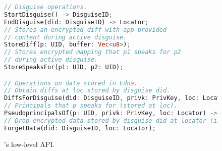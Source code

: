 \begin{figure}[t]
\begin{lstlisting}[language=Rust, style=rust]
// Disguise operations.
StartDisguise() -> DisguiseID;
EndDisguise(did: DisguiseID) -> Locator;
// Stores an encrypted diff with app-provided
// content during active disguise.
StoreDiff(p: UID, buffer: Vec<u8>);
// Stores encrypted mapping that p1 speaks for p2
// during active disguise.
StoreSpeaksFor(p1: UID, p2: UID);

// Operations on data stored in Edna.
// Obtain diffs at loc stored by disguise did.
DiffsForDisguise(did: DisguiseID, privk: PrivKey, loc: Locator) -> Vec<Vec<u8>>;
// Principals that p speaks for (stored at loc).
PseudoprincipalsOf(p: UID, privk: PrivKey, loc: Locator) -> Vec<UID>;
// Drop encrypted data stored by disguise did at locator (irreversible).
ForgetData(did: DisguiseID, loc: Locator);
\end{lstlisting}
\caption{\sys's low-level API.}
\label{f:api-low}
\end{figure}


